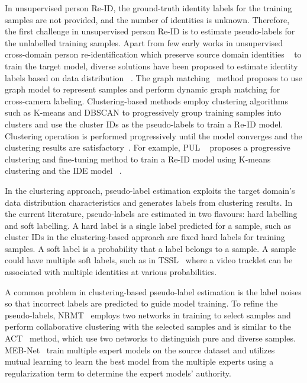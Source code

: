 \documentclass[a4paper,fleqn]{cas-dc}
\begin{document}
In unsupervised person Re-ID, the ground-truth identity labels for the training samples are not provided, and the number of identities is unknown. Therefore, the first challenge in unsupervised person Re-ID is to estimate pseudo-labels for the unlabelled training samples. Apart from few early works in unsupervised cross-domain person re-identification which preserve source domain identities ~\cite{wei_person_2018,deng_image-image_2018} to train the target model, diverse solutions have been proposed to estimate identity labels based on data distribution ~\cite{fan_unsupervised_2018,ye_dynamic_2017,liu_stepwise_2017,wu_exploit_2018,zhong_invariance_2019,wu_clustering_2019}. The graph matching~\cite{ye_dynamic_2017} method proposes to use graph model to represent samples and perform dynamic graph matching for cross-camera labeling. Clustering-based methods employ clustering algorithms such as K-means and DBSCAN to progressively group training samples into clusters and use the cluster IDs as the pseudo-labels to train a Re-ID model. Clustering operation is performed progressively until the model converges and the clustering results are satisfactory~\cite{fan_unsupervised_2018,zheng_mars_2016,zhang_self-training_2019,fu_self-similarity_2019}. For example, PUL ~\cite{fan_unsupervised_2018} proposes a progressive clustering and fine-tuning method to train a Re-ID model using K-means clustering and the IDE model ~\cite{zheng_person_2016}. 

In the clustering approach, pseudo-label estimation exploits the target domain's data distribution characteristics and generates labels from clustering results. In the current literature, pseudo-labels are estimated in two flavours: hard labelling and soft labelling. A hard label is a single label predicted for a sample, such as cluster IDs in the clustering-based approach are fixed hard labels for training samples. A soft label is a probability that a label belongs to a sample. A sample could have multiple soft labels, such as in TSSL~\cite{wu_tracklet_2020} where a video tracklet can be associated with multiple identities at various probabilities. 

A common problem in clustering-based pseudo-label estimation is the label noises so that incorrect labels are predicted to guide model training. To refine the pseudo-labels, NRMT~\cite{vedaldi_unsupervised_2020} employs two networks in training to select samples and perform collaborative clustering with the selected samples and is similar to the ACT~\cite{yang_asymmetric_2020} method, which use two networks to distinguish pure and diverse samples. MEB-Net~\cite{vedaldi_multiple_2020} train multiple expert models on the source dataset and utilizes mutual learning to learn the best model from the multiple experts using a regularization term to determine the expert models' authority.
\end{document}
